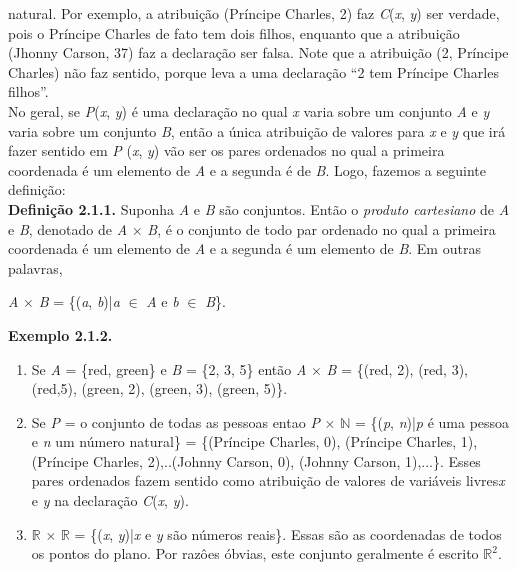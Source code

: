 natural. Por exemplo, a atribuição (Príncipe Charles, 2) faz \textit{C}(\textit{x}, \textit{y}) ser verdade, pois o Príncipe Charles de fato 
tem dois filhos, enquanto que a atribuição (Jhonny Carson, 37) faz a declaração ser falsa. Note que a atribuição (2, Príncipe Charles) não 
faz sentido, porque leva a uma declaração ``2 tem Príncipe Charles filhos''. 
\\
\indent No geral, se \textit{P}(\textit{x}, \textit{y}) é uma declaração no qual \textit{x} varia sobre um conjunto \textit{A} e \textit{y} varia
sobre um conjunto \textit{B}, então a única atribuição de valores para \textit{x} e \textit{y} que irá fazer sentido em \textit{P}
(\textit{x}, \textit{y}) vão ser os pares ordenados no qual a primeira coordenada é um elemento de \textit{A} e a segunda é de \textit{B}. Logo, fazemos a seguinte definição:
\\
\textbf{Definição 2.1.1.} Suponha \textit{A} e \textit{B} são conjuntos. Então o \textit{produto cartesiano} de
\textit{A} e \textit{B}, denotado de \textit{A} $\times$ \textit{B}, é o conjunto de todo par ordenado no qual a primeira 
coordenada é um elemento de \textit{A} e a segunda é um elemento de \textit{B}. Em outras palavras, 
\begin{center}
\textit{A} $\times$ \textit {B} = \{(\textit{a}, \textit{b})|\textit{a} $\in$ \textit{A} e \textit{b} $\in$ \textit{B}\}.
\end{center}
\textbf{Exemplo 2.1.2.}
\\
\begin{enumerate}
\item Se \textit{A} = \{red, green\} e \textit{B} = \{2, 3, 5\} então \textit{A} $\times$ \textit{B} = \{(red, 2), (red, 3), (red,5), (green, 2), (green, 3), (green, 5)\}.
\item Se \textit{P} = o conjunto de todas as pessoas  entao \textit{P} $\times$ $\mathbb{N}$ = \{(\textit{p}, \textit{n})|\textit{p} é uma pessoa e \textit{n} um número natural\} = \{(Príncipe Charles, 0), (Príncipe Charles, 1), (Príncipe Charles, 2),..(Johnny Carson, 0), (Johnny Carson, 1),...\}. Esses pares ordenados fazem sentido como atribuição de valores de variáveis livres\textit{x} e \textit{y} na declaração \textit{C}(\textit{x}, \textit{y}). 
\item $\mathbb{R}$ $\times$ $\mathbb{R}$ = \{(\textit{x}, \textit{y})|\textit{x} e \textit{y} são números reais\}. Essas são as coordenadas de todos os pontos do plano. Por razôes óbvias, este conjunto geralmente é escrito $\mathbb{R}^2$.
\end{enumerate}

